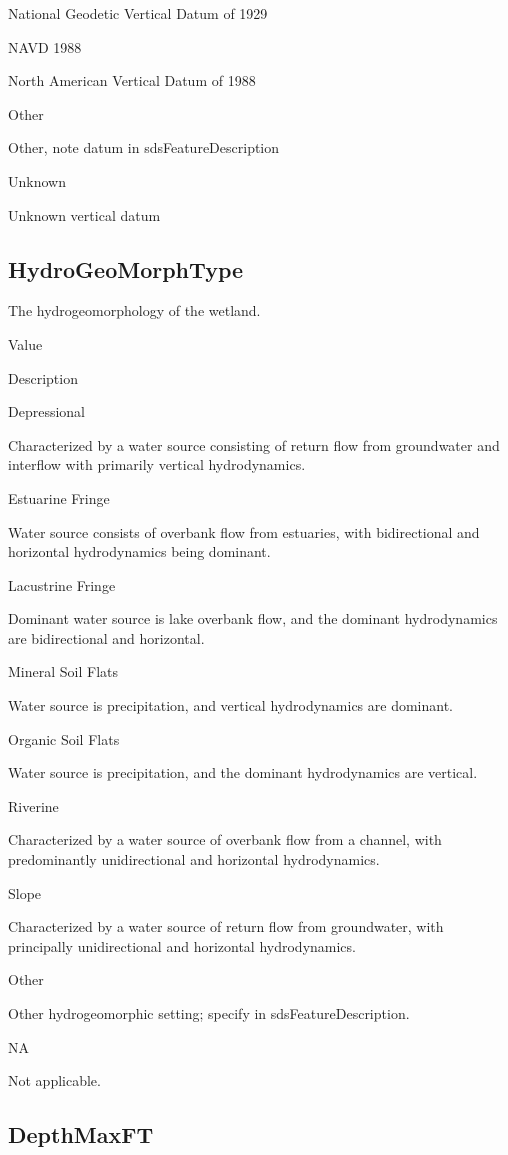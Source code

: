 \documentclass[
  letterpaper,
  DIV=11,
  numbers=noendperiod]{scrreprt}
\begin{document}
National Geodetic Vertical Datum of 1929

NAVD 1988

North American Vertical Datum of 1988

Other

Other, note datum in sdsFeatureDescription

Unknown

Unknown vertical datum

\subsection{HydroGeoMorphType}\label{hydrogeomorphtype}

The hydrogeomorphology of the wetland.

Value

Description

Depressional

Characterized by a water source consisting of return flow from
groundwater and interflow with primarily vertical hydrodynamics.

Estuarine Fringe

Water source consists of overbank flow from estuaries, with
bidirectional and horizontal hydrodynamics being dominant.

Lacustrine Fringe

Dominant water source is lake overbank flow, and the dominant
hydrodynamics are bidirectional and horizontal.

Mineral Soil Flats

Water source is precipitation, and vertical hydrodynamics are dominant.

Organic Soil Flats

Water source is precipitation, and the dominant hydrodynamics are
vertical.

Riverine

Characterized by a water source of overbank flow from a channel, with
predominantly unidirectional and horizontal hydrodynamics.

Slope

Characterized by a water source of return flow from groundwater, with
principally unidirectional and horizontal hydrodynamics.

Other

Other hydrogeomorphic setting; specify in sdsFeatureDescription.

NA

Not applicable.

\subsection{DepthMaxFT}\label{depthmaxft}
\end{document}
